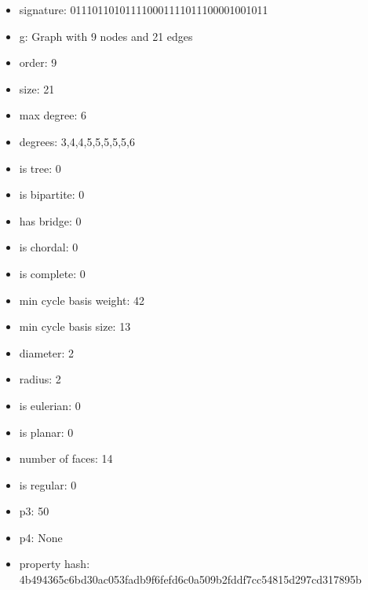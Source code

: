 \newpage
\begin{figure}
\end{figure}
\begin{itemize}
\item signature: 011101101011110001111011100001001011
\item g: Graph with 9 nodes and 21 edges
\item order: 9
\item size: 21
\item max degree: 6
\item degrees: 3,4,4,5,5,5,5,5,6
\item is tree: 0
\item is bipartite: 0
\item has bridge: 0
\item is chordal: 0
\item is complete: 0
\item min cycle basis weight: 42
\item min cycle basis size: 13
\item diameter: 2
\item radius: 2
\item is eulerian: 0
\item is planar: 0
\item number of faces: 14
\item is regular: 0
\item p3: 50
\item p4: None
\item property hash: 4b494365c6bd30ac053fadb9f6fefd6c0a509b2fddf7cc54815d297cd317895b
\end{itemize}
